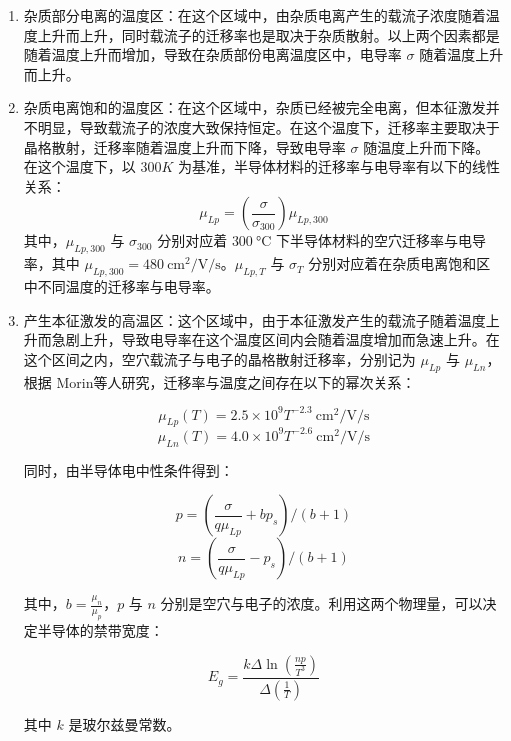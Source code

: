 \documentclass[font=default]{mpltx}
\begin{document}
\begin{enumerate}[label=\alph*) ]
	\item 杂质部分电离的温度区：在这个区域中，由杂质电离产生的载流子浓度随着温度上升而上升，同时载流子的迁移率也是取决于杂质散射。以上两个因素都是随着温度上升而增加，导致在杂质部份电离温度区中，电导率 $\sigma$ 随着温度上升而上升。

	\item 杂质电离饱和的温度区：在这个区域中，杂质已经被完全电离，但本征激发并不明显，导致载流子的浓度大致保持恒定。在这个温度下，迁移率主要取决于晶格散射，迁移率随着温度上升而下降，导致电导率 $\sigma$ 随温度上升而下降。
	在这个温度下，以 $300K$ 为基准，半导体材料的迁移率与电导率有以下的线性关系：
	\begin{equation}
		\mu_{Lp} = (\frac{\sigma}{\sigma_{300}})\mu_{Lp,300}
	\end{equation}
	其中，$\mu_{Lp,300}$ 与 $\sigma_{300}$ 分别对应着 $\qty{300}{\degreeCelsius}$ 下半导体材料的空穴迁移率与电导率，其中 ${\mu_{Lp,300}}=\qty{480}{\cm\squared\per\V\per\s}$。$\mu_{Lp,T}$ 与 $\sigma_T$ 分别对应着在杂质电离饱和区中不同温度的迁移率与电导率。

	\item 产生本征激发的高温区：这个区域中，由于本征激发产生的载流子随着温度上升而急剧上升，导致电导率在这个温度区间内会随着温度增加而急速上升。在这个区间之内，空穴载流子与电子的晶格散射迁移率，分别记为 $\mu_{Lp}$ 与 $\mu_{Ln}$，根据 Morin等人研究，迁移率与温度之间存在以下的幂次关系：
	
	\begin{equation}
		\mu_{Lp}(T) = 2.5\times10^9 T^{-2.3}\qty{}{\cm\squared\per\V\per\s}
	\end{equation}
	\begin{equation}
		\mu_{Ln}(T) = 4.0\times10^9 T^{-2.6}\qty{}{\cm\squared\per\V\per\s}
	\end{equation}

	同时，由半导体电中性条件得到：

	\begin{equation}
		p=(\frac{\sigma}{q\mu_{Lp}}+bp_s)/(b+1)
	\end{equation}
	\begin{equation}
		n=(\frac{\sigma}{q\mu_{Lp}}-p_s)/(b+1)
	\end{equation}
	
	其中，$b = \frac{\mu_{n}}{\mu_{p}}$，$p$ 与 $n$ 分别是空穴与电子的浓度。利用这两个物理量，可以决定半导体的禁带宽度：

	\begin{equation}
		E_g=\frac{k\Delta\ln(\frac{np}{T^3})}{\Delta(\frac{1}{T})}
	\end{equation}

	其中 $k$ 是玻尔兹曼常数。
\end{enumerate}
\end{document}
